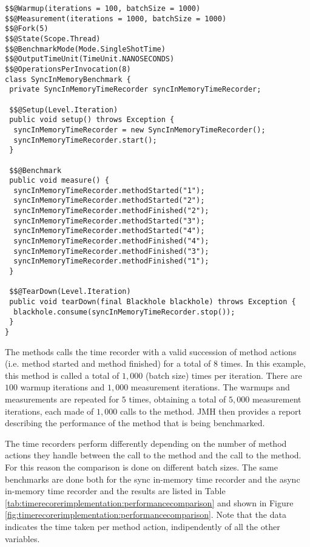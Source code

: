 \noindent\begin{minipage}[c]{\linewidth}
\begin{lstlisting}[breaklines,caption={$SyncInMemoryTimeRecorder$ microbenchmark},label=lis:timerecorderimplementation:syncinmemorytimerecordermicrobenchmark]
$$@Warmup(iterations = 100, batchSize = 1000)
$$@Measurement(iterations = 1000, batchSize = 1000)
$$@Fork(5)
$$@State(Scope.Thread)
$$@BenchmarkMode(Mode.SingleShotTime)
$$@OutputTimeUnit(TimeUnit.NANOSECONDS)
$$@OperationsPerInvocation(8)
class SyncInMemoryBenchmark {
 private SyncInMemoryTimeRecorder syncInMemoryTimeRecorder;

 $$@Setup(Level.Iteration)
 public void setup() throws Exception {
  syncInMemoryTimeRecorder = new SyncInMemoryTimeRecorder();
  syncInMemoryTimeRecorder.start();
 }

 $$@Benchmark
 public void measure() {
  syncInMemoryTimeRecorder.methodStarted("1");
  syncInMemoryTimeRecorder.methodStarted("2");
  syncInMemoryTimeRecorder.methodFinished("2");
  syncInMemoryTimeRecorder.methodStarted("3");
  syncInMemoryTimeRecorder.methodStarted("4");
  syncInMemoryTimeRecorder.methodFinished("4");
  syncInMemoryTimeRecorder.methodFinished("3");
  syncInMemoryTimeRecorder.methodFinished("1");
 }

 $$@TearDown(Level.Iteration)
 public void tearDown(final Blackhole blackhole) throws Exception {
  blackhole.consume(syncInMemoryTimeRecorder.stop());
 }
}
\end{lstlisting}
\end{minipage}

\noindent The  methods calls the time recorder with a valid succession of method actions (i.e. method started and method finished) for a total of $8$ times. In this example, this method is called a total of $1,000$ (batch size) times per iteration. There are $100$ warmup iterations and $1,000$ measurement iterations. The warmups and measurements are repeated for $5$ times, obtaining a total of $5,000$ measurement iterations, each made of $1,000$ calls to the  method. JMH then provides a report describing the performance of the method that is being benchmarked.

\noindent The time recorders perform differently depending on the number of method actions they handle between the call to the  method and the call to the  method. For this reason the comparison is done on different batch sizes. The same benchmarks are done both for the sync in-memory time recorder and the async in-memory time recorder and the results are listed in Table \ref{tab:timerecorerimplementation:performancecomparison} and  shown in Figure \ref{fig:timerecorerimplementation:performancecomparison}. Note that the data indicates the time taken per method action, indipendently of all the other variables.

